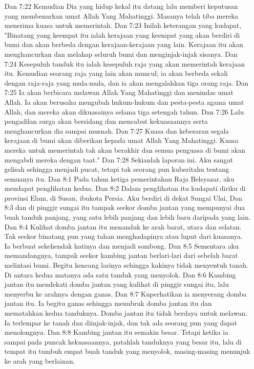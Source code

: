 Dan 7:22  Kemudian Dia yang hidup kekal itu datang lalu memberi keputusan yang membenarkan umat Allah Yang Mahatinggi. Masanya telah tiba mereka menerima kuasa untuk memerintah.
Dan 7:23  Inilah keterangan yang kudapat, "Binatang yang keempat itu ialah kerajaan yang keempat yang akan berdiri di bumi dan akan berbeda dengan kerajaan-kerajaan yang lain. Kerajaan itu akan menghancurkan dan melahap seluruh bumi dan menginjak-injak sisanya.
Dan 7:24  Kesepuluh tanduk itu ialah kesepuluh raja yang akan memerintah kerajaan itu. Kemudian seorang raja yang lain akan muncul; ia akan berbeda sekali dengan raja-raja yang mula-mula, dan ia akan mengalahkan tiga orang raja.
Dan 7:25  Ia akan berbicara melawan Allah Yang Mahatinggi dan menindas umat Allah. Ia akan berusaha mengubah hukum-hukum dan pesta-pesta agama umat Allah, dan mereka akan dikuasainya selama tiga setengah tahun.
Dan 7:26  Lalu pengadilan surga akan bersidang dan mencabut kekuasaannya serta menghancurkan dia sampai musnah.
Dan 7:27  Kuasa dan kebesaran segala kerajaan di bumi akan diberikan kepada umat Allah Yang Mahatinggi. Kuasa mereka untuk memerintah tak akan berakhir dan semua penguasa di bumi akan mengabdi mereka dengan taat."
Dan 7:28  Sekianlah laporan ini. Aku sangat gelisah sehingga menjadi pucat, tetapi tak seorang pun kuberitahu tentang semuanya itu.
Dan 8:1  Pada tahun ketiga pemerintahan Raja Belsyazar, aku mendapat penglihatan kedua.
Dan 8:2  Dalam penglihatan itu kudapati diriku di provinsi Elam, di Susan, ibukota Persia. Aku berdiri di dekat Sungai Ulai,
Dan 8:3  dan di pinggir sungai itu tampak seekor domba jantan yang mempunyai dua buah tanduk panjang, yang satu lebih panjang dan lebih baru daripada yang lain.
Dan 8:4  Kulihat domba jantan itu menanduk ke arah barat, utara dan selatan. Tak seekor binatang pun yang tahan menghadapinya atau luput dari kuasanya. Ia berbuat sekehendak hatinya dan menjadi sombong.
Dan 8:5  Sementara aku memandangnya, tampak seekor kambing jantan berlari-lari dari sebelah barat melintasi bumi. Begitu kencang larinya sehingga kakinya tidak menyentuh tanah. Di antara kedua matanya ada satu tanduk yang menyolok.
Dan 8:6  Kambing jantan itu mendekati domba jantan yang kulihat di pinggir sungai itu, lalu menyerbu ke arahnya dengan ganas.
Dan 8:7  Kuperhatikan ia menyerang domba jantan itu. Ia begitu ganas sehingga menubruk domba jantan itu dan mematahkan kedua tanduknya. Domba jantan itu tidak berdaya untuk melawan. Ia terlempar ke tanah dan diinjak-injak, dan tak ada seorang pun yang dapat menolongnya.
Dan 8:8  Kambing jantan itu semakin besar. Tetapi ketika ia sampai pada puncak kekuasaannya, patahlah tanduknya yang besar itu, lalu di tempat itu tumbuh empat buah tanduk yang menyolok, masing-masing menunjuk ke arah yang berlainan.
